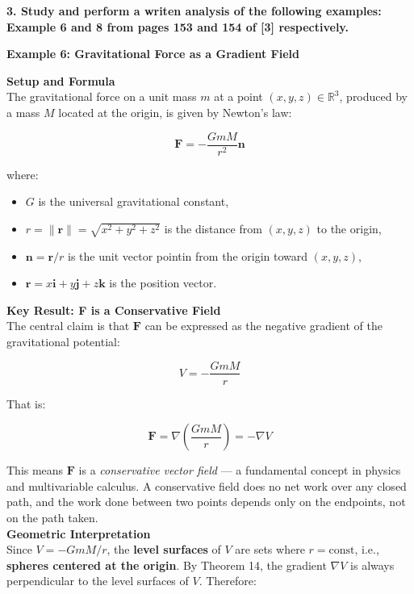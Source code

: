 \textbf{3. Study and perform a writen analysis of the following examples: Example 6 and 8 from pages 153 and 154 of [3] respectively.}

\begin{respuesta}


\textbf{Example 6: Gravitational Force as a Gradient Field}

\textbf{Setup and Formula}\\

The gravitational force on a unit mass $m$ at a point $(x, y, z) \in \mathbb{R}^3$, produced by a mass $M$ located at the origin, is given by Newton's law:

\[
\mathbf{F} = -\frac{GmM}{r^2}\mathbf{n}
\]

where:
\begin{itemize}
    \item $G$ is the universal gravitational constant,
    \item $r = \|\mathbf{r}\| = \sqrt{x^2 + y^2 + z^2}$ is the distance from $(x,y,z)$ to the origin,
    \item $\mathbf{n} = \mathbf{r}/r$ is the unit vector pointin from the origin toward $(x,y,z)$,
    \item $\mathbf{r} = x\mathbf{i} + y\mathbf{j} + z\mathbf{k}$ is the position vector.
\end{itemize}

\textbf{Key Result: F is a Conservative Field}\\

The central claim is that $\mathbf{F}$ can be expressed as the negative gradient of the gravitational potential:

\[
V = -\frac{GmM}{r}
\]

That is:

\[
\mathbf{F} = \nabla\!\left(\frac{GmM}{r}\right) = -\nabla V
\]

This means $\mathbf{F}$ is a \textit{conservative vector field} --- a fundamental concept in physics and multivariable calculus. A conservative field does no net work over any closed path, and the work done between two points depends only on the endpoints, not on the path taken.\\

\textbf{Geometric Interpretation}\\

Since $V = -GmM/r$, the \textbf{level surfaces} of $V$ are sets where $r = \text{const}$, i.e., \textbf{spheres centered at the origin}. By Theorem 14, the gradient $\nabla V$ is always perpendicular to the level surfaces of $V$. Therefore:


\end{respuesta}
